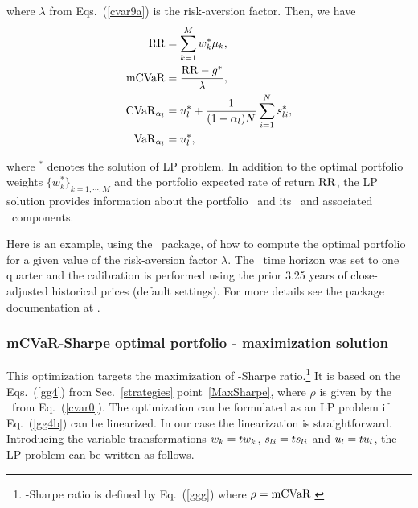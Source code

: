 \noindent where $\lambda$ from Eqs.~(\ref{cvar9a}) is the risk-aversion factor.
Then, we have
\begin{subequations}\label{cvar10}
\begin{align}
    \RR &= \sum_{k=1}^M w_k^* \mu_k, \label{cvar10a} \\
    \mCVaR &= \frac{\RR - g^*}{\lambda}, \label{cvar10b} \\
    \CVaR_{\alpha_l} &= u_l^* + \frac{1}{(1-\alpha_l)N} \sum_{i=1}^N s_{li}^*, \label{cvar10c} \\
    \VaR_{\alpha_l} &= u_l^*, \label{cvar10d}
\end{align}
\end{subequations}

\noindent where $^*$ denotes the solution of LP problem.
In addition to the optimal portfolio weights $\{w_k^*\}_{k=1,\cdots,M}$ and the portfolio expected rate of return ${\rm RR}$,
the LP solution provides information about the portfolio \mCVaR\ and its \CVaR\  and associated \VaR\ components.

\bigskip
\noindent Here is an example, using the \azapy\ package, of how to compute the optimal portfolio
for a given value of the risk-aversion factor $\lambda$.
The \mCVaR\ time horizon was set to one quarter and the calibration is performed using the prior 3.25 years of
close-adjusted historical prices (default settings).
For more details see the package documentation at \azapydoc.



\BackToContents

\subsubsection{mCVaR-Sharpe optimal portfolio - maximization solution}
This optimization targets the maximization of \mCVaR-Sharpe
ratio.\footnote{\mCVaR-Sharpe ratio is defined by Eq.~(\ref{ggg}) where $\rho={\rm mCVaR}$.}
It is based on the Eqs.~(\ref{gg4}) from Sec.~\ref{strategies} point~\ref{MaxSharpe},
where $\rho$ is given by the \mCVaR\ from Eq.~(\ref{cvar0}).
The optimization can be formulated as an LP problem if Eq.~(\ref{gg4b}) can be linearized.
In our case the linearization is straightforward. Introducing the
variable transformations ${\bar w}_k = t w_k$, ${\bar s}_{li} = t s_{li}$ and ${\bar u}_l = t u_l$, the LP
problem can be written as follows.

